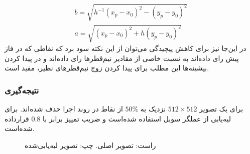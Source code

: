 \documentclass[12pt,a4paper]{article}
\numberwithin{equation}{section}
\numberwithin{figure}{section}
\theoremstyle{definition}
\theoremstyle{theorem}
\theoremstyle{definition}
\begin{document}
\begin{gather}
b = \sqrt{h^{-1}(x_p - x_0)^2 - (y_p-y_0)^2}
\nonumber
\\[0.5cm]
a = \sqrt{(x_p - x_0)^2 + h(y_p-y_0)^2}
\label{eq:semiaxis}
\end{gather}
در این‌جا نیز برای کاهش پیچیدگی می‌توان از این نکته سود برد که نقاطی که در فاز پیش رای داده‌اند به نسبت خاصی از مقادیر نیم‌قطرها رای داده‌اند و در پیدا کردن بیشینه‌ها این مطلب برای پیدا کردن زوج‌ نیم‌قطرهای نظیر، مفید است. 

\subsubsection{نتیجه‌گیری}

برای یک تصویر 
\( 512 \times 512 \) 
نزدیک به
\( 50\% \)
از نقاط در روند اجرا حذف شده‌اند. برای لبه‌یابی از عملگر سوبل استفاده شده‌است و ضریب تمییز برابر با 
\( 0.8 \) 
قرارداده شده‌است. 


\begin{figure}[h]
\centering
{}
\hspace{3mm}
\caption{راست: تصویر اصلی. چپ: تصویر لبه‌یابی‌شده \cite{FEHT} }
\label{fig:fehtMain}
\end{figure}
\end{document}
